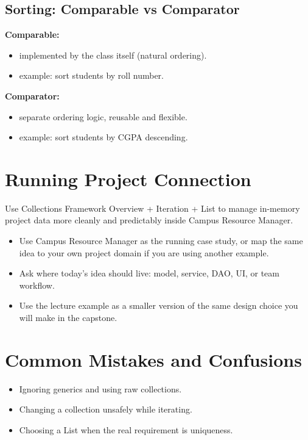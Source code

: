 \documentclass[11pt]{article}
\begin{document}
\subsection{Sorting: Comparable vs Comparator}
\textbf{Comparable:}
\begin{itemize}
  \item implemented by the class itself (natural ordering).
  \item example: sort students by roll number.
\end{itemize}

\textbf{Comparator:}
\begin{itemize}
  \item separate ordering logic, reusable and flexible.
  \item example: sort students by CGPA descending.
\end{itemize}
\notesources{\OOPSUnitVSources}

\section{Running Project Connection}
Use Collections Framework Overview + Iteration + List to manage in-memory project data more cleanly and predictably inside Campus Resource Manager.
\begin{itemize}
  \item Use Campus Resource Manager as the running case study, or map the same idea to your own project domain if you are using another example.
  \item Ask where today's idea should live: model, service, DAO, UI, or team workflow.
  \item Use the lecture example as a smaller version of the same design choice you will make in the capstone.
\end{itemize}
\notesources{\OOPSUnitVSources}

\section{Common Mistakes and Confusions}
\begin{itemize}
  \item Ignoring generics and using raw collections.
  \item Changing a collection unsafely while iterating.
  \item Choosing a List when the real requirement is uniqueness.
\end{itemize}
\notesources{\OOPSUnitVSources}
\end{document}
